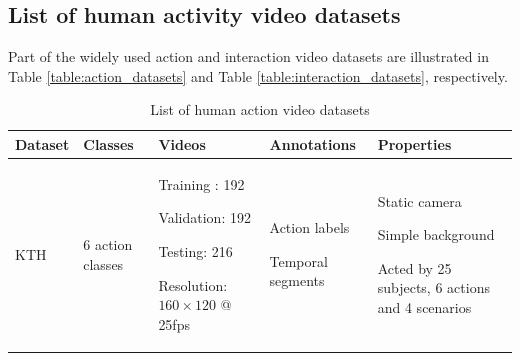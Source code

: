 \subsection{List of human activity video datasets}
Part of the widely used action and interaction video datasets are illustrated in Table \ref{table:action_datasets} and Table \ref{table:interaction_datasets}, respectively.
\begin{table}
	\caption{List of human action video datasets}
	\begin{center}
		\begin{tabular}{| p{2.5cm} | p{1.5cm} | p{4cm} | p{3cm} | p{4cm} |}
			\hline
			Dataset & Classes & Videos & Annotations & Properties \\ \hline \hline
			KTH\cite{kth} 
			& %
			6 action classes 
			& %
			\vspace{-5mm}
			\begin{myitemize}
				\item Training : 192
				\item Validation: 192
				\item Testing: 216
				\item Resolution: \(160 \times 120\) @ 25fps
			\end{myitemize}
            & %
			\vspace{-5mm}
			\begin{myitemize}
				\item Action labels
				\item Temporal segments
			\end{myitemize}
	    	& %
	    	\vspace{-5mm}
	    	\begin{myitemize}
	    		\item Static camera
	    		\item Simple background
	    		\item Acted by 25 subjects, 6 actions and 4 scenarios
	    	\end{myitemize}
    		\\ \hline 
	    	

\end{tabular}
\end{center}
\end{table}
